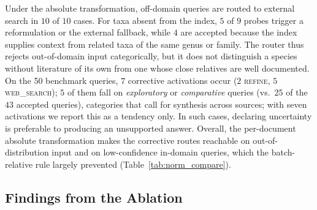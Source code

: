 \documentclass[runningheads]{llncs}
\begin{document}
Under the absolute transformation, off-domain queries are routed to external search in $10$ of $10$ cases. For taxa absent from the index, $5$ of $9$ probes trigger a reformulation or the external fallback, while $4$ are accepted because the index supplies context from related taxa of the same genus or family. The router thus rejects out-of-domain input categorically, but it does not distinguish a species without literature of its own from one whose close relatives are well documented. On the 50 benchmark queries, $7$ corrective activations occur ($2$ \textsc{refine}, $5$ \textsc{web\_search}); $5$ of them fall on \textit{exploratory} or \textit{comparative} queries (vs.\ $25$ of the $43$ accepted queries), categories that call for synthesis across sources; with seven activations we report this as a tendency only. In such cases, declaring uncertainty is preferable to producing an unsupported answer. Overall, the per-document absolute transformation makes the corrective routes reachable on out-of-distribution input and on low-confidence in-domain queries, which the batch-relative rule largely prevented (Table~\ref{tab:norm_compare}).

\subsection{Findings from the Ablation}
\label{sec:ablation}
\end{document}
